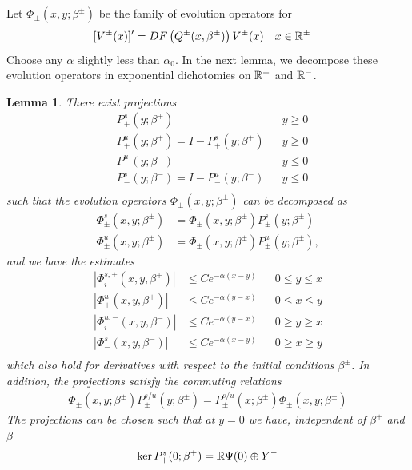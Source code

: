 \documentclass[10pt,reqno]{amsart}
\theoremstyle{plain}
\newtheorem{lemma}[theorem]{Lemma}
\theoremstyle{definition}
\theoremstyle{remark}
\numberwithin{theorem}{section}
\numberwithin{equation}{section}
\begin{document}
Let $\Phi_\pm(x, y; \beta^\pm)$ be the family of evolution operators for
\begin{align}\label{qpmODEs}
[V^\pm(x)]' &= D F\left(Q^\pm(x, \beta^\pm)\right) V^\pm(x) && x \in \mathbb{R}^\pm
\end{align}
Choose any $\alpha$ slightly less than $\alpha_0$. In the next lemma, we decompose these evolution operators in exponential dichotomies on $\mathbb{R}^+$ and $\mathbb{R}^-$. 

\begin{lemma}\label{dichotomy1}
There exist projections
\begin{align*}
&P_+^s(y; \beta^+) && y \geq 0 \\
&P_+^u(y; \beta^+) = I - P_+^s(y; \beta^+) && y \geq 0 \\
&P_-^u(y; \beta^-) && y \leq 0 \\
&P_-^s(y; \beta^-) = I - P_-^u(y; \beta^-) && y \leq 0 \\
\end{align*}
such that the evolution operators $\Phi_\pm(x, y; \beta^\pm)$ can be decomposed as
\begin{align*}
\Phi^s_\pm(x, y; \beta^\pm) &= \Phi_\pm(x, y; \beta^\pm) P^s_\pm(y; \beta^\pm) \\
\Phi^u_\pm(x, y; \beta^\pm) &= \Phi_\pm(x, y; \beta^\pm) P^u_\pm(y; \beta^\pm),
\end{align*}
and we have the estimates
\begin{align*}
|\Phi_i^{s,+}(x, y, \beta^+)| &\leq C e^{-\alpha(x - y)} && 0 \leq y \leq x \\
|\Phi^u_+(x, y, \beta^+)| &\leq C e^{-\alpha(y - x)} && 0 \leq x \leq y \\
|\Phi_i^{u,-}(x, y, \beta^-)| &\leq C e^{-\alpha(y - x)} && 0 \geq y \geq x \\
|\Phi^s_-(x, y, \beta^-)| &\leq C e^{-\alpha(x - y)} && 0 \geq x \geq y \\
\end{align*}
which also hold for derivatives with respect to the initial conditions $\beta^\pm$. In addition, the projections satisfy the commuting relations
\begin{align*}
\Phi_\pm(x, y; \beta^\pm) P^{s/u}_\pm(y; \beta^\pm) 
= P^{s/u}_\pm(x; \beta^\pm) \Phi_\pm(x, y; \beta^\pm)
\end{align*}
The projections can be chosen such that at $y = 0$ we have, independent of $\beta^+$ and $\beta^-$
\begin{align*}
\ker P^s_+(0; \beta^+) &= \R \Psi(0) \oplus Y^- \\

\end{align*}
\end{lemma}
\end{document}
